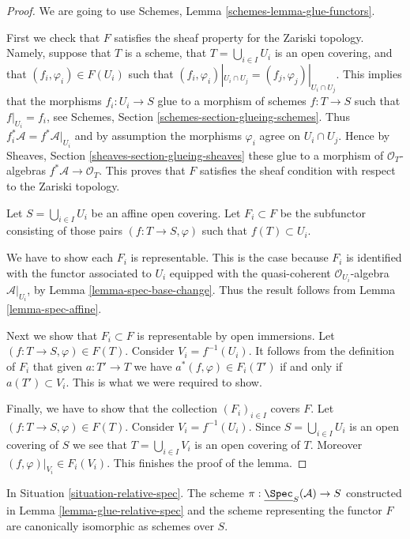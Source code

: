 \begin{proof}
We are going to use Schemes, Lemma \ref{schemes-lemma-glue-functors}.

\medskip\noindent
First we check that $F$ satisfies the sheaf property for the
Zariski topology. Namely, suppose that $T$ is a scheme,
that $T = \bigcup_{i \in I} U_i$ is an open covering,
and that $(f_i, \varphi_i) \in F(U_i)$ such that
$(f_i, \varphi_i)|_{U_i \cap U_j} = (f_j, \varphi_j)|_{U_i \cap U_j}$.
This implies that the morphisms $f_i : U_i \to S$
glue to a morphism of schemes $f : T \to S$ such that
$f|_{U_i} = f_i$, see Schemes, Section \ref{schemes-section-glueing-schemes}.
Thus $f_i^*\mathcal{A} = f^*\mathcal{A}|_{U_i}$ and by assumption the
morphisms $\varphi_i$ agree on $U_i \cap U_j$. Hence by Sheaves,
Section \ref{sheaves-section-glueing-sheaves} these glue to a
morphism of $\mathcal{O}_T$-algebras $f^*\mathcal{A} \to \mathcal{O}_T$.
This proves that $F$ satisfies the sheaf condition with respect to
the Zariski topology.

\medskip\noindent
Let $S = \bigcup_{i \in I} U_i$ be an affine open covering.
Let $F_i \subset F$ be the subfunctor consisting of
those pairs $(f : T \to S, \varphi)$ such that
$f(T) \subset U_i$.

\medskip\noindent
We have to show each $F_i$ is representable.
This is the case because $F_i$ is identified with
the functor associated to $U_i$ equipped with
the quasi-coherent $\mathcal{O}_{U_i}$-algebra $\mathcal{A}|_{U_i}$,
by Lemma \ref{lemma-spec-base-change}.
Thus the result follows from Lemma \ref{lemma-spec-affine}.

\medskip\noindent
Next we show that $F_i \subset F$ is representable by open immersions.
Let $(f : T \to S, \varphi) \in F(T)$. Consider $V_i = f^{-1}(U_i)$.
It follows from the definition of $F_i$ that given $a : T' \to T$
we have $a^*(f, \varphi) \in F_i(T')$ if and only if $a(T') \subset V_i$.
This is what we were required to show.

\medskip\noindent
Finally, we have to show that the collection $(F_i)_{i \in I}$
covers $F$. Let $(f : T \to S, \varphi) \in F(T)$.
Consider $V_i = f^{-1}(U_i)$. Since $S = \bigcup_{i \in I} U_i$
is an open covering of $S$ we see that $T = \bigcup_{i \in I} V_i$
is an open covering of $T$. Moreover $(f, \varphi)|_{V_i} \in F_i(V_i)$.
This finishes the proof of the lemma.
\end{proof}

\begin{lemma}
\label{lemma-glueing-gives-functor-spec}
In Situation \ref{situation-relative-spec}.
The scheme $\pi : \underline{\Spec}_S(\mathcal{A}) \to S$
constructed in Lemma \ref{lemma-glue-relative-spec}
and the scheme representing the functor $F$ are
canonically isomorphic as schemes over $S$.
\end{lemma}

